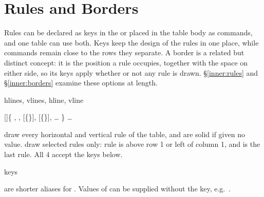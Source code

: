 \section{Rules and Borders}\label{impatient:rules}
Rules can be declared as keys in the  or placed in the table body as commands, and one table can use both. Keys keep the design of the rules in one place, while commands remain close to the rows they separate. A border is a related but distinct concept: it is the position a rule occupies, together with the space on either side, so its keys apply whether or not any rule is drawn. \S\ref{inner:rules} and \S\ref{inner:borders} examine these options at length.

\begin{codedescribe}[keys]{hlines, vlines, hline, vline}
  \begin{codesyntax}
    []\{
        \quad{},
        \quad{},
        \quad{}[\{\}],
        \quad{}[\{\}],
        \quad\ldots
        \}
        \quad\ldots
        \tsmacro{\end{tblr}}{}
  \end{codesyntax}
   draw every horizontal and vertical rule of the table, and are solid if given no value.  draw selected rules only: rule  is above row 1 or left of column 1, and  is the last rule. All 4 accept the keys below.
  \begin{describelist*}{keys}
    \begin{tsremark}
       are shorter aliases for . Values of  can be supplied without the key, e.g.\ .
    \end{tsremark}
  \end{describelist*}
\end{codedescribe}

